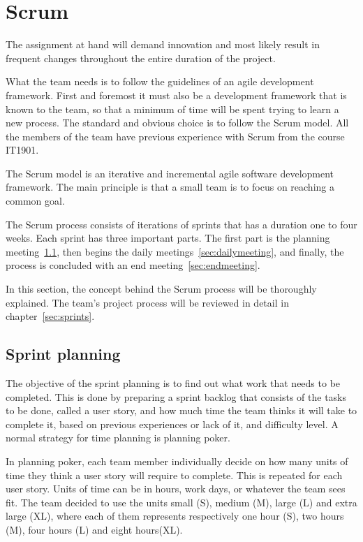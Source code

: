 \section{Scrum}

The assignment at hand will demand innovation and most likely result in frequent changes throughout the entire duration of the project.

What the team needs is to follow the guidelines of an agile development framework. First and foremost it must also be a development framework that is known to the team, so that a minimum of time will be spent trying to learn a new process. The standard and obvious choice is to follow the Scrum model. All the members of the team have previous experience with Scrum from the course IT1901.

The Scrum model is an iterative and incremental agile software development framework. The main principle is that a small team is to focus on reaching a common goal.

The Scrum process consists of iterations of sprints that has a duration one to four weeks. Each sprint has three important parts.
The first part is the planning meeting~\ref{sec:sprintplanning}, then begins the daily  meetings~\ref{sec:dailymeeting}, and finally, the process is concluded with an end meeting~\ref{sec:endmeeting}.

In this section, the concept behind the Scrum process will be thoroughly explained. The team's project process will be reviewed in detail in chapter~\ref{sec:sprints}.

\subsection{Sprint planning}
\label{sec:sprintplanning}
The objective of the sprint planning is to find out what work that needs to be
completed. This is done by preparing a sprint backlog that consists of the tasks
to be done, called a user story, and how much time the team thinks it will take to complete it, based on previous experiences or lack of it, and difficulty level. A normal strategy for time planning is planning poker.

In planning poker, each team member individually decide on how many units of
time they think a user story will require to complete. This is repeated for each
user story.
Units of time can be in hours, work days, or whatever the team sees fit.
The team decided to use the units small (S), medium (M), large (L) and extra
large (XL), where each of them represents respectively one hour (S), two hours (M), four hours (L) and eight hours(XL).

